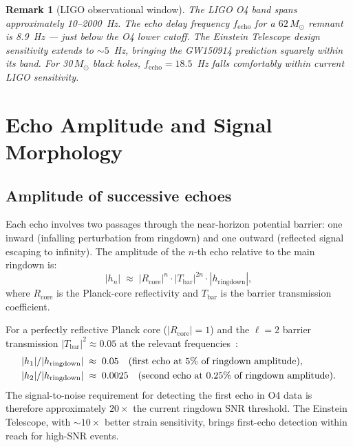 \documentclass[12pt]{article}
\newtheorem{remark}[theorem]{Remark}
\begin{document}
\begin{remark}[LIGO observational window]
The LIGO O4 band spans approximately 10--2000~Hz.  The echo delay
frequency $f_{\mathrm{echo}}$ for a $62\,M_\odot$ remnant is 8.9~Hz
— just below the O4 lower cutoff.  The Einstein Telescope design
sensitivity extends to $\sim\!5$~Hz, bringing the GW150914 prediction
squarely within its band.  For 30\,$M_\odot$ black holes,
$f_{\mathrm{echo}} = 18.5$~Hz falls comfortably within current LIGO
sensitivity.
\end{remark}

\section{Echo Amplitude and Signal Morphology}
\label{sec:amplitude}

\subsection{Amplitude of successive echoes}

Each echo involves two passages through the near-horizon potential barrier:
one inward (infalling perturbation from ringdown) and one outward (reflected
signal escaping to infinity).  The amplitude of the $n$-th echo relative
to the main ringdown is:
\begin{equation}
  |h_n| \;\approx\; |R_{\mathrm{core}}|^n \cdot |T_{\mathrm{bar}}|^{2n}
  \cdot |h_{\mathrm{ringdown}}|,
  \label{eq:amplitude}
\end{equation}
where $R_{\mathrm{core}}$ is the Planck-core reflectivity and
$T_{\mathrm{bar}}$ is the barrier transmission coefficient.

For a perfectly reflective Planck core ($|R_{\mathrm{core}}| = 1$) and
the $\ell = 2$ barrier transmission $|T_{\mathrm{bar}}|^2 \approx 0.05$
at the relevant frequencies~\cite{berti2009}:
\begin{align}
  |h_1|/|h_{\mathrm{ringdown}}| &\;\approx\; 0.05
  \quad (\text{first echo at 5\% of ringdown amplitude}), \notag\\
  |h_2|/|h_{\mathrm{ringdown}}| &\;\approx\; 0.0025
  \quad (\text{second echo at 0.25\% of ringdown amplitude}).
  \label{eq:amp_values}
\end{align}
The signal-to-noise requirement for detecting the first echo in O4 data is
therefore approximately $20\times$ the current ringdown SNR threshold.  The
Einstein Telescope, with $\sim\!10\times$ better strain sensitivity, brings
first-echo detection within reach for high-SNR events.
\end{document}
